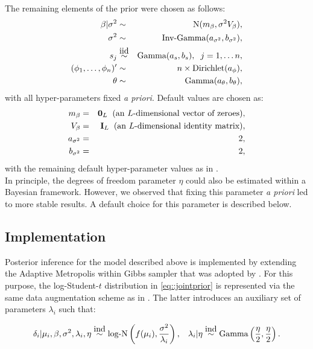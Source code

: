 The remaining elements of the prior were chosen as follows: \begin{eqnarray}
\beta|\sigma^2 & \sim &\textnormal{N}(m_\beta,\sigma^2V_\beta),\\
\sigma^2 & \sim & \textnormal{Inv-Gamma}(a_{\sigma^2},b_{\sigma^2}),\\
s_j & \stackrel{\mbox{iid}}{\sim} & \textnormal{Gamma}(a_s,b_s), \hspace{0.2cm} j = 1, \ldots n,\\
(\phi_1, \ldots, \phi_n)' & \sim & n \times \textnormal{Dirichlet}(a_\phi),\\
\theta & \sim & \textnormal{Gamma}(a_\theta,b_\theta),
\end{eqnarray} with all hyper-parameters fixed \emph{a priori}. Default values are chosen as: \begin{eqnarray}
m_{\beta} & = & \mathbf{0}_L \hspace{0.2cm} \text{(an $L$-dimensional vector of zeroes)},\\
V_{\beta} & = & \mathbf{I}_L \hspace{0.2cm} \text{(an $L$-dimensional identity matrix)},\\
a_{\sigma^2} & = & 2,\\
b_{\sigma^2} & = & 2,
\end{eqnarray} with the remaining default hyper-parameter values as in \cite{Vallejos2016}.\\

In principle, the degrees of freedom parameter $\eta$ could also be estimated within a Bayesian framework. However, we observed that fixing this parameter \emph{a priori} led to more stable results. A default choice for this parameter is described below.

\subsection{Implementation}

Posterior inference for the model described above is implemented by extending the Adaptive Metropolis within Gibbs sampler \citep{Roberts2009} that was adopted by \cite{Vallejos2016}. For this purpose, the log-Student-$t$ distribution in \ref{eq::jointprior} is represented via the same data augmentation scheme as in \cite{Vallejos2015}. The latter introduces an auxiliary set of parameters $\lambda_i$ such that:

\begin{equation}
\delta_i| \mu_i,\beta,\sigma^2, \lambda_i, \eta \stackrel{\mbox{ind}}{\sim} \textnormal{log-N}\left( f(\mu_i),\frac{\sigma^2}{\lambda_i} \right), \hspace{0.3cm} \lambda_i|\eta \stackrel{\mbox{ind}}{\sim} \text{Gamma}\left(\frac{\eta}{2},\frac{\eta}{2}\right).
\end{equation} 

